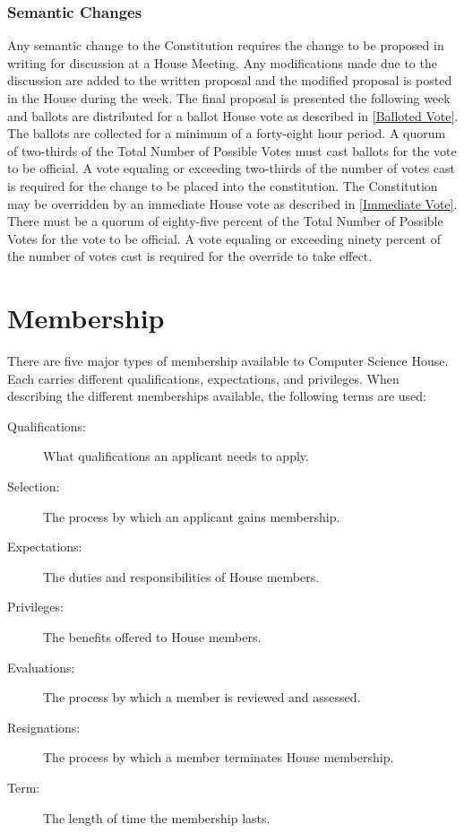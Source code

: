 \documentclass{article}
\newcommand{\article}[1]{\section{#1} \label{#1}}
\newcommand{\asubsection}[1]{\subsubsection{#1} \label{#1}}
\begin{document}
\asubsection{Semantic Changes}
Any semantic change to the Constitution requires the change to be proposed in writing for discussion at a House Meeting. Any modifications made due to the discussion are added to the written proposal and the modified proposal is posted in the House during the week. The final proposal is presented the following week and ballots are distributed for a ballot House vote as described in \ref{Balloted Vote}. The ballots are collected for a minimum of a forty-eight hour period. A quorum of two-thirds of the Total Number of Possible Votes must cast ballots for the vote to be official. A vote equaling or exceeding two-thirds of the number of votes cast is required for the change to be placed into the constitution. The Constitution may be overridden by an immediate House vote as described in \ref{Immediate Vote}. There must be a quorum of eighty-five percent of the Total Number of Possible Votes for the vote to be official. A vote equaling or exceeding ninety percent of the number of votes cast is required for the override to take effect.

\article{Membership}
There are five major types of membership available to Computer Science House. Each carries different qualifications, expectations, and privileges. When describing the different memberships available, the following terms are used:
\begin{description}
	\item[Qualifications:] What qualifications an applicant needs to apply.
	\item[Selection:] The process by which an applicant gains membership.
	\item[Expectations:] The duties and responsibilities of House members.
	\item[Privileges:] The benefits offered to House members.
	\item[Evaluations:] The process by which a member is reviewed and assessed.
	\item[Resignations:] The process by which a member terminates House membership.
	\item[Term:] The length of time the membership lasts.
\end{description}
\end{document}
